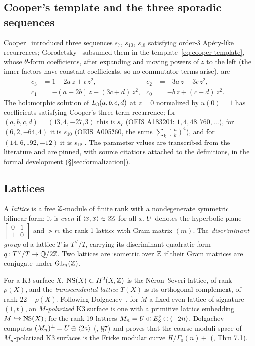 \subsection{Cooper's template and the three sporadic sequences}

Cooper~\cite{Cooper2012} introduced three sequences $s_7$, $s_{10}$, $s_{18}$
satisfying order-3 Ap\'ery-like recurrences; Gorodetsky~\cite{Gorodetsky2023}
subsumed them in the template~\eqref{eq:cooper-template}, whose
$\theta$-form coefficients, after expanding and moving powers of $z$ to the
left (the inner factors have constant coefficients, so no commutator terms
arise), are
\begin{equation}\label{eq:cooper-coeffs}
\begin{aligned}
  c_3 &= 1 - 2a\,z + c\,z^2, &
  c_2 &= -3a\,z + 3c\,z^2, \\
  c_1 &= -(a+2b)\,z + (3c+d)\,z^2, &
  c_0 &= -b\,z + (c+d)\,z^2.
\end{aligned}
\end{equation}
The holomorphic solution of $L_3(a,b,c,d)$ at $z=0$ normalized by
$u(0)=1$ has coefficients satisfying Cooper's three-term recurrence; for
$(a,b,c,d)=(13,4,-27,3)$ this is $s_7$ (OEIS A183204: $1, 4, 48, 760,
\dots$), for $(6,2,-64,4)$ it is $s_{10}$ (OEIS A005260, the sums
$\sum_k\binom{n}{k}^4$), and for $(14,6,192,-12)$ it is $s_{18}$
\cite{Cooper2012,Gorodetsky2023}. The parameter values are transcribed from
the literature and are pinned, with source citations attached to the
definitions, in the formal development (\S\ref{sec:formalization}).

\subsection{Lattices}

A \emph{lattice} is a free $\mathbb{Z}$-module of finite rank with a nondegenerate
symmetric bilinear form; it is \emph{even} if $\langle x,x\rangle\in 2\mathbb{Z}$ for all $x$.
$U$ denotes the hyperbolic plane
$\left[\begin{smallmatrix}0&1\\1&0\end{smallmatrix}\right]$ and $\lat{m}$ the
rank-1 lattice with Gram matrix $(m)$. The \emph{discriminant group} of a
lattice $T$ is $T^\vee/T$, carrying its discriminant quadratic form
$q\colon T^\vee/T\to\mathbb{Q}/2\mathbb{Z}$. Two lattices are isometric over $\mathbb{Z}$ if their
Gram matrices are conjugate under $\operatorname{GL}_n(\mathbb{Z})$.

For a K3 surface $X$, $\operatorname{NS}(X)\subset H^2(X,\mathbb{Z})$ is the N\'eron--Severi
lattice, of rank $\rho(X)$, and the \emph{transcendental lattice} $T(X)$ is
its orthogonal complement, of rank $22-\rho(X)$. Following
Dolgachev~\cite{Dolgachev1996}, for $M$ a fixed even lattice of signature
$(1,t)$, an \emph{$M$-polarized} K3 surface is one with a primitive lattice
embedding $M\hookrightarrow \operatorname{NS}(X)$; for the rank-19 lattices
$M_n = U\oplus E_8^2\oplus\langle -2n\rangle$, Dolgachev computes
$(M_n)^{\perp} = U\oplus\langle 2n\rangle$ (\cite{Dolgachev1996}, \S7) and proves
that the coarse moduli space of $M_n$-polarized K3 surfaces is the Fricke
modular curve $H/\Gamma_0(n)+$ (\cite{Dolgachev1996}, Thm 7.1).

